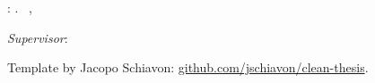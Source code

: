 \thispagestyle{empty}

\hfill

\vfill

\noindent\myName: \swash{\myTitle,} \mySubtitle.
\textcopyright~\myLocation,~\myDate

\medskip
%
\noindent\textit{Supervisor}:~\myProf 

\medskip

\noindent Template by Jacopo Schiavon: \href{https://github.com/jschiavon/clean-thesis}{github.com/jschiavon/clean-thesis}.
